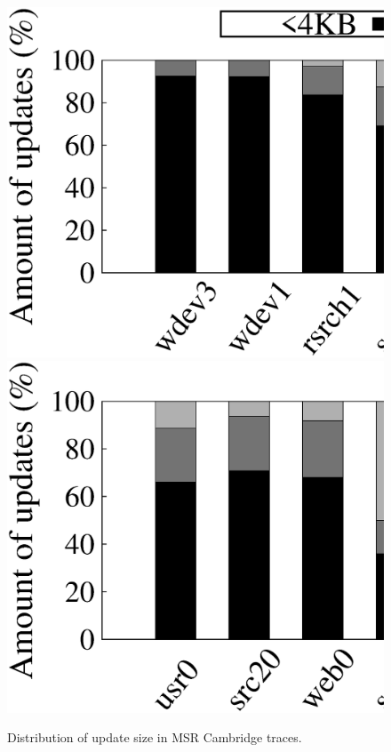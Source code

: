 \begin{figure}[t]
    \centering
    \includegraphics[width=\linewidth]{charts/msr_dist/eps/msr_dist_1}
    \includegraphics[width=\linewidth]{charts/msr_dist/eps/msr_dist_2}
    \caption{Distribution of update size in MSR Cambridge traces.}
    \label{fig:msr_dist}
\end{figure}

